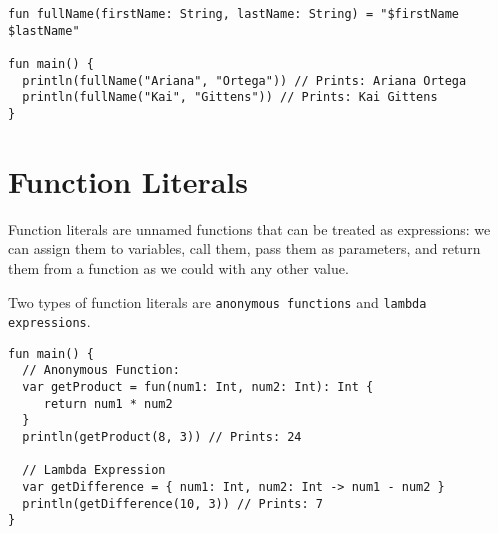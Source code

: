 \begin{verbatim}
fun fullName(firstName: String, lastName: String) = "$firstName $lastName"
 
fun main() {
  println(fullName("Ariana", "Ortega")) // Prints: Ariana Ortega
  println(fullName("Kai", "Gittens")) // Prints: Kai Gittens
}
\end{verbatim}

\section{Function Literals}
Function literals are unnamed functions that can be treated as expressions: 
we can assign them to variables, call them, pass them as parameters, and return 
them from a function as we could with any other value.

Two types of function literals are \verb!anonymous functions! and \verb!lambda expressions!.

\begin{verbatim}
fun main() {
  // Anonymous Function:
  var getProduct = fun(num1: Int, num2: Int): Int {
     return num1 * num2
  }
  println(getProduct(8, 3)) // Prints: 24
 
  // Lambda Expression
  var getDifference = { num1: Int, num2: Int -> num1 - num2 }
  println(getDifference(10, 3)) // Prints: 7
}
\end{verbatim}